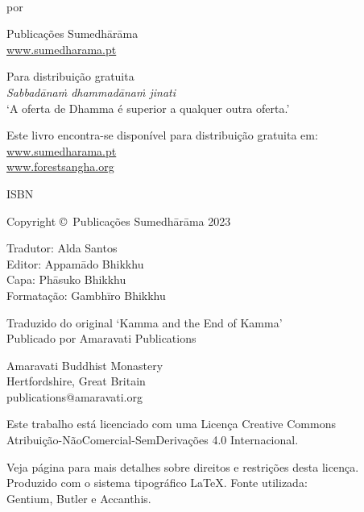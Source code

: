 \cleartoverso
\thispagestyle{empty}

{\copyrightsize
\centering
\setlength{\parindent}{0pt}%
\setlength{\parskip}{0.8\baselineskip}%

\thetitle\\
por \theauthor

Publicações Sumedhārāma\\
\href{https://sumedharama.pt}{www.sumedharama.pt}

Para distribuição gratuita\\
\textit{Sabbadānaṁ dhammadānaṁ jinati}\\
‘A oferta de Dhamma é superior a qualquer outra oferta.’

Este livro encontra-se disponível para distribuição gratuita em:\\
\href{https://sumedharama.pt}{www.sumedharama.pt}\\
\href{https://forestsangha.org}{www.forestsangha.org}

ISBN \theISBN

Copyright \copyright\ Publicações Sumedhārāma 2023

Tradutor: Alda Santos\\
Editor: Appamādo Bhikkhu\\
Capa: Phāsuko Bhikkhu\\
Formatação: Gambhīro Bhikkhu

Traduzido do original `Kamma and the End of Kamma'\\
Publicado por Amaravati Publications

Amaravati Buddhist Monastery\\
Hertfordshire, Great Britain\\
publications@amaravati.org

\vfill

{\footnotesize

Este trabalho está licenciado com uma Licença Creative Commons\\
Atribuição-NãoComercial-SemDerivações 4.0 Internacional.

Veja página \pageref{copyright-details} para mais detalhes sobre direitos e restrições desta licença.\\
Produzido com o sistema tipográfico \LaTeX. Fonte utilizada:\\
Gentium, Butler e Accanthis.

\theEditionInfo

}}
